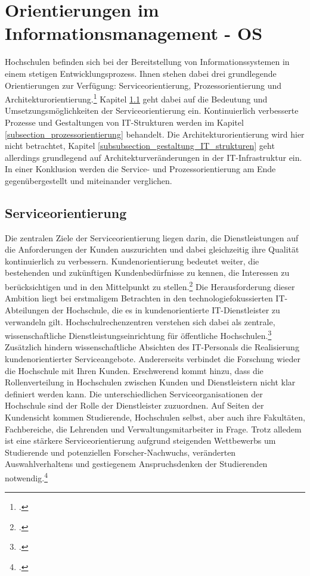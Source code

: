 \section{Orientierungen im Informationsmanagement - OS}

Hochschulen befinden sich bei der Bereitstellung von Informationssystemen in einem stetigen Entwicklungsprozess. Ihnen stehen dabei drei grundlegende Orientierungen zur Verfügung: Serviceorientierung, Prozessorientierung und Architekturorientierung.\footcite[Vgl.][32]{leitner_itil_2008} Kapitel \ref{subsection_serviceorientierung} geht dabei auf die Bedeutung und Umsetzungsmöglichkeiten der Serviceorientierung ein. Kontinuierlich verbesserte Prozesse und Gestaltungen von IT-Strukturen werden im Kapitel \ref{subsection_prozessorientierung} behandelt. Die Architekturorientierung wird hier nicht betrachtet, Kapitel \ref{subsubsection_gestaltung_IT_strukturen} geht allerdings grundlegend auf Architekturveränderungen in der IT-Infrastruktur ein. In einer Konklusion werden die Service- und Prozessorientierung am Ende gegenübergestellt und miteinander verglichen.


\subsection{Serviceorientierung}
\label{subsection_serviceorientierung}
Die zentralen Ziele der Serviceorientierung liegen darin, die Dienstleistungen auf die 
Anforderungen der Kunden auszurichten und dabei gleichzeitig ihre Qualität kontinuierlich zu verbessern. Kundenorientierung bedeutet weiter, die bestehenden und zukünftigen Kundenbedürfnisse zu kennen, die Interessen zu berücksichtigen und in den Mittelpunkt zu stellen.\footcite[Vgl.][34]{leitner_itil_2008} Die Herausforderung dieser Ambition liegt bei erstmaligem Betrachten in den technologiefokussierten IT-Abteilungen der Hochschule, die es in kundenorientierte IT-Dienstleister zu verwandeln gilt. Hochschulrechenzentren verstehen sich dabei als zentrale, wissenschaftliche Dienstleistungseinrichtung für öffentliche Hochschulen.\footcite[Vgl.][10]{schroeder_2011} Zusätzlich hindern wissenschaftliche Absichten des IT-Personals die Realisierung kundenorientierter Serviceangebote. Andererseits verbindet die Forschung wieder die Hochschule mit Ihren Kunden. Erschwerend kommt hinzu, dass die Rollenverteilung in Hochschulen zwischen Kunden und Dienstleistern nicht klar definiert werden kann. Die unterschiedlichen Serviceorganisationen der Hochschule sind der Rolle der Dienstleister zuzuordnen. Auf Seiten der Kundensicht kommen Studierende, Hochschulen selbst, aber auch ihre Fakultäten, Fachbereiche, die Lehrenden und Verwaltungsmitarbeiter in Frage. Trotz alledem ist eine stärkere Serviceorientierung aufgrund steigenden Wettbewerbs um Studierende und 
potenziellen Forscher-Nachwuchs, veränderten Auswahlverhaltens und gestiegenem 
Anspruchsdenken der Studierenden notwendig.\footcite[Vgl.][14]{leitner_itil_2008}

